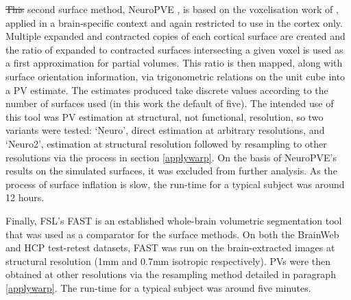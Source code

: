 \documentclass[12pt]{report}
\providecommand{\DIFaddtex}[1]{{\protect\color{blue}\uwave{#1}}} %
\providecommand{\DIFdeltex}[1]{{\protect\color{red}\sout{#1}}}                      %
\providecommand{\DIFaddbegin}{} %
\providecommand{\DIFaddend}{} %
\providecommand{\DIFdelbegin}{} %
\providecommand{\DIFdelend}{} %
\providecommand{\DIFadd}[1]{\texorpdfstring{\DIFaddtex{#1}}{#1}} %
\providecommand{\DIFdel}[1]{\texorpdfstring{\DIFdeltex{#1}}{}} %
\newcommand{\DIFscaledelfig}{0.5}
\newlength{\DIFdelgraphicswidth} %
\newlength{\DIFdelgraphicsheight} %
\newcommand{\DIFaddincludegraphics}[2][]{{\color{blue}\fbox{\DIFOincludegraphics[#1]{#2}}}} %
\newcommand{\DIFdelincludegraphics}[2][]{%
\sbox{\DIFdelgraphicsbox}{\DIFOincludegraphics[#1]{#2}}%
\settoboxwidth{\DIFdelgraphicswidth}{\DIFdelgraphicsbox} %
\settoboxtotalheight{\DIFdelgraphicsheight}{\DIFdelgraphicsbox} %
\scalebox{\DIFscaledelfig}{%
\parbox[b]{\DIFdelgraphicswidth}{\usebox{\DIFdelgraphicsbox}\\[-\baselineskip] \rule{\DIFdelgraphicswidth}{0em}}\llap{\resizebox{\DIFdelgraphicswidth}{\DIFdelgraphicsheight}{%
\setlength{\unitlength}{\DIFdelgraphicswidth}%
\begin{picture}(1,1)%
\thicklines\linethickness{2pt} %
{\color[rgb]{1,0,0}\put(0,0){\framebox(1,1){}}}%
{\color[rgb]{1,0,0}\put(0,0){\line( 1,1){1}}}%
{\color[rgb]{1,0,0}\put(0,1){\line(1,-1){1}}}%
\end{picture}%
}\hspace*{3pt}}} %
} %
\DeclareRobustCommand{\DIFaddbegin}{\DIFOaddbegin \let\includegraphics\DIFaddincludegraphics} %
\DeclareRobustCommand{\DIFaddend}{\DIFOaddend \let\includegraphics\DIFOincludegraphics} %
\DeclareRobustCommand{\DIFdelbegin}{\DIFOdelbegin \let\includegraphics\DIFdelincludegraphics} %
\DeclareRobustCommand{\DIFdelend}{\DIFOaddend \let\includegraphics\DIFOincludegraphics} %
\begin{document}
\DIFdelbegin \DIFdel{This }\DIFdelend \DIFaddbegin \DIFadd{The }\DIFaddend second surface method, NeuroPVE \cite{NeuropolyPVE}, is based on the voxelisation work of \cite{Nooruddin2003}, applied in a brain-specific context and again restricted to use in the cortex only. Multiple expanded and contracted copies of each cortical surface are created and the ratio of expanded to contracted surfaces intersecting a given voxel is used as a first approximation for partial volumes. This ratio is then mapped, along with surface orientation information, via trigonometric relations on the unit cube into a PV estimate. The estimates produced take discrete values according to the number of surfaces used (in this work the default of five). The intended use of this tool was PV estimation at structural, not functional, resolution, so two variants were tested: ‘Neuro’, direct estimation at arbitrary resolutions, and ‘Neuro2’, estimation at structural resolution followed by resampling to other resolutions via the process in section \ref{applywarp}. On the basis of NeuroPVE’s results on the simulated surfaces, it was excluded from further analysis. As the process of surface inflation is slow, the run-time for a typical subject was around 12 hours. 

Finally, FSL’s FAST \cite{Zhang2001} is an established whole-brain volumetric segmentation tool that was used as a comparator for the surface methods. On both the BrainWeb and HCP test-retest datasets, FAST was run on the brain-extracted images at structural resolution (1mm and 0.7mm isotropic respectively). PVs were then obtained at other resolutions via the resampling method detailed in paragraph \ref{applywarp}. The run-time for a typical subject was around five minutes. 
\end{document}
